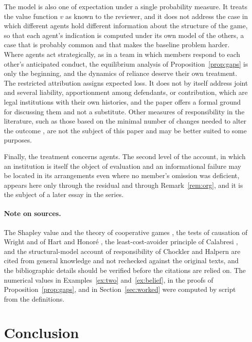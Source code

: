 \documentclass[11pt]{article}
\theoremstyle{plain}
\theoremstyle{definition}
\begin{document}
The model is also one of expectation under a single probability measure. It treats the value function $v$ as known to the reviewer, and it does not address the case in which different agents hold different information about the structure of the game, so that each agent's indication is computed under its own model of the others, a case that is probably common and that makes the baseline problem harder. Where agents act strategically, as in a team in which members respond to each other's anticipated conduct, the equilibrium analysis of Proposition~\ref{prop:gaps} is only the beginning, and the dynamics of reliance deserve their own treatment. The restricted attribution assigns expected loss. It does not by itself address joint and several liability, apportionment among defendants, or contribution, which are legal institutions with their own histories, and the paper offers a formal ground for discussing them and not a substitute. Other measures of responsibility in the literature, such as those based on the minimal number of changes needed to alter the outcome \cite{chockler2004responsibility}, are not the subject of this paper and may be better suited to some purposes.

Finally, the treatment concerns agents. The second level of the account, in which an institution is itself the object of evaluation and an informational failure may be located in its arrangements even where no member's omission was deficient, appears here only through the residual and through Remark~\ref{rem:org}, and it is the subject of a later essay in the series.

\paragraph{Note on sources.} The Shapley value and the theory of cooperative games \cite{shapley1953value}, the tests of causation of Wright and of Hart and Honor\'e \cite{wright1985causation,hart1959causation}, the least-cost-avoider principle of Calabresi \cite{calabresi1970costs}, and the structural-model account of responsibility of Chockler and Halpern \cite{chockler2004responsibility} are cited from general knowledge and not rechecked against the original texts, and the bibliographic details should be verified before the citations are relied on. The numerical values in Examples~\ref{ex:two} and~\ref{ex:belief}, in the proofs of Proposition~\ref{prop:gaps}, and in Section~\ref{sec:worked} were computed by script from the definitions.

\section{Conclusion}\label{sec:conclusion}
\end{document}
